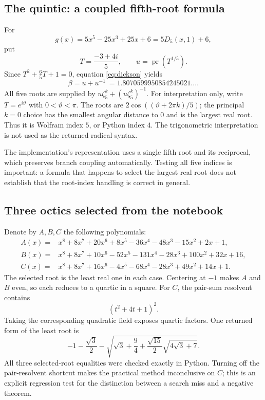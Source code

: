 \documentclass[11pt,letterpaper]{article}
\theoremstyle{definition}\newtheorem{definition}[theorem]{Definition}
\theoremstyle{remark}\newtheorem{remark}[theorem]{Remark}
\newcommand{\pr}{\operatorname{pr}}
\begin{document}
\subsection{The quintic: a coupled fifth-root formula}
For
\[
 g(x)=5x^5-25x^3+25x+6=5D_5(x,1)+6,
\]
put
\[
 T=\frac{-3+4i}{5},\qquad u=\pr(T^{1/5}).
\]
Since $T^2+\tfrac65T+1=0$, equation \eqref{eq:dickson} yields
\begin{equation}\label{eq:quinticanswer}
 \boxed{\beta=u+u^{-1}}
 \ =1.8070599950854245021\ldots.
\end{equation}
All five roots are supplied by $u\zeta_5^k+(u\zeta_5^k)^{-1}$.
For interpretation only, write $T=e^{i\vartheta}$ with $0<\vartheta<\pi$.
The roots are $2\cos((\vartheta+2\pi k)/5)$; the principal $k=0$ choice
has the smallest angular distance to $0$ and is the largest real root.
Thus it is Wolfram index $5$, or Python index $4$. The trigonometric
interpretation is not used as the returned radical syntax.

The implementation's representation uses a single fifth root and its
reciprocal, which preserves branch coupling automatically. Testing all five
indices is important: a formula that happens to select the largest real
root does not establish that the root-index handling is correct in general.

\subsection{Three octics selected from the notebook}
\label{sec:octics}
Denote by $A,B,C$ the following polynomials:
\begin{align*}
 A(x)={}&x^8+8x^7+20x^6+8x^5-36x^4-48x^3-15x^2+2x+1,\\
 B(x)={}&x^8+8x^7+10x^6-52x^5-131x^4-28x^3+100x^2+32x+16,\\
 C(x)={}&x^8+8x^7+16x^6-4x^5-68x^4-28x^3+49x^2+14x+1.
\end{align*}
The selected root is the least real one in each case. Centering at $-1$
makes $A$ and $B$ even, so each reduces to a quartic in a square.
For $C$, the pair-sum resolvent contains
\[
 (t^2+4t+1)^2.
\]
Taking the corresponding quadratic field exposes quartic factors. One
returned form of the least root is
\begin{equation}\label{eq:octicanswer}
 -1-\frac{\sqrt3}{2}
 -\sqrt{\sqrt3+\frac94+\frac{\sqrt{15}}2\sqrt{4\sqrt3+7}}.
\end{equation}
All three selected-root equalities were checked exactly in Python. Turning
off the pair-resolvent shortcut makes the practical method inconclusive on
$C$; this is an explicit regression test for the distinction between a
search miss and a negative theorem.
\end{document}
